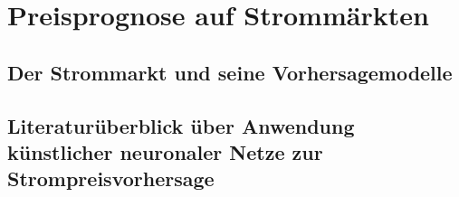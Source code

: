 

\section{Preisprognose auf Strommärkten}\label{sec:strompreis}

\subsection{Der Strommarkt und seine Vorhersagemodelle}\label{sec:vorhersagemodelle}

\subsection{Literaturüberblick über Anwendung künstlicher neuronaler Netze zur Strompreisvorhersage}\label{sec:literaturueberblick}
